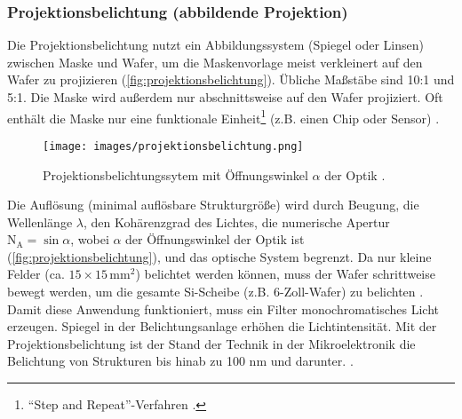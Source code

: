 \documentclass{article} %
\begin{document}


\vspace{1em}

\subsubsection{Projektionsbelichtung (abbildende Projektion)}

Die Projektionsbelichtung nutzt ein Abbildungssystem (Spiegel oder Linsen) zwischen Maske und Wafer, um die Maskenvorlage meist verkleinert auf den Wafer zu projizieren (\autoref{fig:projektionsbelichtung}). Übliche Maßstäbe sind 10:1 und 5:1. Die Maske wird außerdem nur abschnittsweise auf den Wafer projiziert. Oft enthält die Maske nur eine funktionale Einheit\footnote{``Step and Repeat''-Verfahren \cite{schmid2024}.} (z.B. einen Chip oder Sensor) \cite{schmid2024,Mescheder2004}.

\begin{figure}[htb!]
    \centering
    \texttt{[image: images/projektionsbelichtung.png]} %
    \captionsetup{labelfont=bf, width=.55\textwidth} %
    \caption{Projektionsbelichtungssytem mit Öffnungswinkel $\alpha$ der Optik \cite{schmid2024}.}
    \label{fig:projektionsbelichtung}
\end{figure}

\vspace{1em}

Die Auflösung (minimal auflösbare Strukturgröße) wird durch Beugung, die Wellenlänge $\lambda$, den Kohärenzgrad des Lichtes, die numerische Apertur $\mathrm{N_A} = \sin{\alpha}$, wobei $\alpha$ der Öffnungswinkel der Optik ist (\autoref{fig:projektionsbelichtung}), und das optische System begrenzt. Da nur kleine Felder (ca. $15 \times 15 \, \mathrm{mm^2}$) belichtet werden können, muss der Wafer schrittweise bewegt werden, um die gesamte Si-Scheibe (z.B. 6-Zoll-Wafer) zu belichten \cite{Mescheder2004,schmid2024}. Damit diese Anwendung funktioniert, muss ein Filter monochromatisches Licht erzeugen. Spiegel in der Belichtungsanlage erhöhen die Lichtintensität. Mit der Projektionsbelichtung ist der Stand der Technik in der Mikroelektronik die Belichtung von Strukturen bis hinab zu 100 nm und darunter. \cite{schmid2024}.

\vspace{1em}
\end{document}

